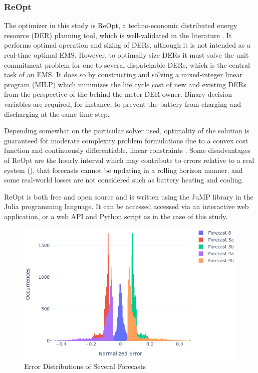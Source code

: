\documentclass[conference]{IEEEtran}
\begin{document}
\subsubsection{ReOpt}

The optimizer in this study is ReOpt, a techno-economic distributed energy resource (DER) planning tool, which is well-validated in the literature \cite{mishra2022computational}. It performs optimal operation and sizing of DERs, although it is not intended as a real-time optimal EMS. However, to optimally size DERs it must solve the unit commitment problem for one to several dispatchable DERs, which is the central task of an EMS. It does so by constructing and solving a mixed-integer linear program (MILP) which minimizes the life cycle cost of new and existing DERs from the perspective of the behind-the-meter DER owner. Binary decision variables are required, for instance, to prevent the battery from charging and discharging at the same time step.

Depending somewhat on the particular solver used, optimality of the solution is guaranteed for moderate complexity problem formulations due to a convex cost function and continuously differentiable, linear constraints \cite{ogunmodede2021optimizing}. Some disadvantages of ReOpt are the hourly interval which may contribute to errors relative to a real system (\cite{omoyele2024impact}), that forecasts cannot be updating in a rolling horizon manner, and some real-world losses are not considered such as battery heating and cooling.

ReOpt is both free and open source and is written using the JuMP library in the Julia programming language. It can be accessed accessed via an interactive web application, or a web API and Python script as in the case of this study.

\begin{figure}
    \centering
    \includegraphics[width=1\linewidth]{images/hist.png}
    \caption{Error Distributions of Several Forecasts}
    \label{fig:hist}
\end{figure}
\end{document}
